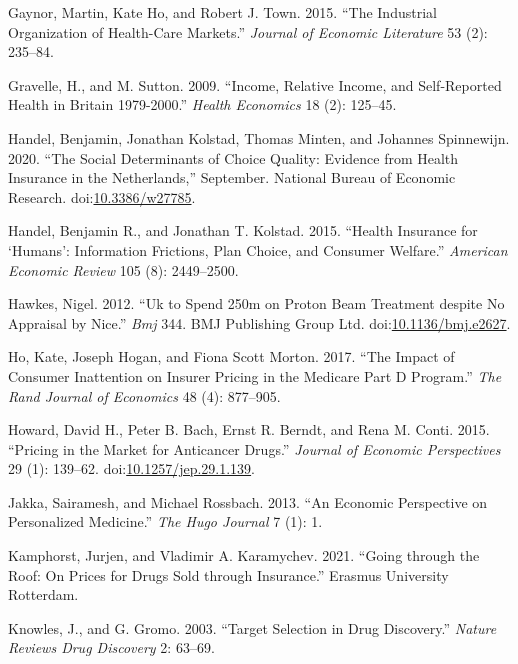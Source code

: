 \documentclass[a4paper,12pt]{article}
\begin{document}
\hypertarget{citeproc_bib_item_17}{Gaynor, Martin, Kate Ho, and Robert J. Town. 2015. “The Industrial Organization of Health-Care Markets.” \textit{Journal of Economic Literature} 53 (2): 235–84.}

\hypertarget{citeproc_bib_item_18}{Gravelle, H., and M. Sutton. 2009. “Income, Relative Income, and Self-Reported Health in Britain 1979-2000.” \textit{Health Economics} 18 (2): 125–45.}

\hypertarget{citeproc_bib_item_19}{Handel, Benjamin, Jonathan Kolstad, Thomas Minten, and Johannes Spinnewijn. 2020. “The Social Determinants of Choice Quality: Evidence from Health Insurance in the Netherlands,” September. National Bureau of Economic Research. doi:\href{https://doi.org/10.3386/w27785}{10.3386/w27785}.}

\hypertarget{citeproc_bib_item_20}{Handel, Benjamin R., and Jonathan T. Kolstad. 2015. “Health Insurance for ‘Humans’: Information Frictions, Plan Choice, and Consumer Welfare.” \textit{American Economic Review} 105 (8): 2449–2500.}

\hypertarget{citeproc_bib_item_21}{Hawkes, Nigel. 2012. “Uk to Spend 250m on Proton Beam Treatment despite No Appraisal by Nice.” \textit{Bmj} 344. BMJ Publishing Group Ltd. doi:\href{https://doi.org/10.1136/bmj.e2627}{10.1136/bmj.e2627}.}

\hypertarget{citeproc_bib_item_22}{Ho, Kate, Joseph Hogan, and Fiona Scott Morton. 2017. “The Impact of Consumer Inattention on Insurer Pricing in the Medicare Part D Program.” \textit{The Rand Journal of Economics} 48 (4): 877–905.}

\hypertarget{citeproc_bib_item_23}{Howard, David H., Peter B. Bach, Ernst R. Berndt, and Rena M. Conti. 2015. “Pricing in the Market for Anticancer Drugs.” \textit{Journal of Economic Perspectives} 29 (1): 139–62. doi:\href{https://doi.org/10.1257/jep.29.1.139}{10.1257/jep.29.1.139}.}

\hypertarget{citeproc_bib_item_24}{Jakka, Sairamesh, and Michael Rossbach. 2013. “An Economic Perspective on Personalized Medicine.” \textit{The Hugo Journal} 7 (1): 1.}

\hypertarget{citeproc_bib_item_25}{Kamphorst, Jurjen, and Vladimir A. Karamychev. 2021. “Going through the Roof: On Prices for Drugs Sold through Insurance.” Erasmus University Rotterdam.}

\hypertarget{citeproc_bib_item_26}{Knowles, J., and G. Gromo. 2003. “Target Selection in Drug Discovery.” \textit{Nature Reviews Drug Discovery} 2: 63–69.}
\end{document}
